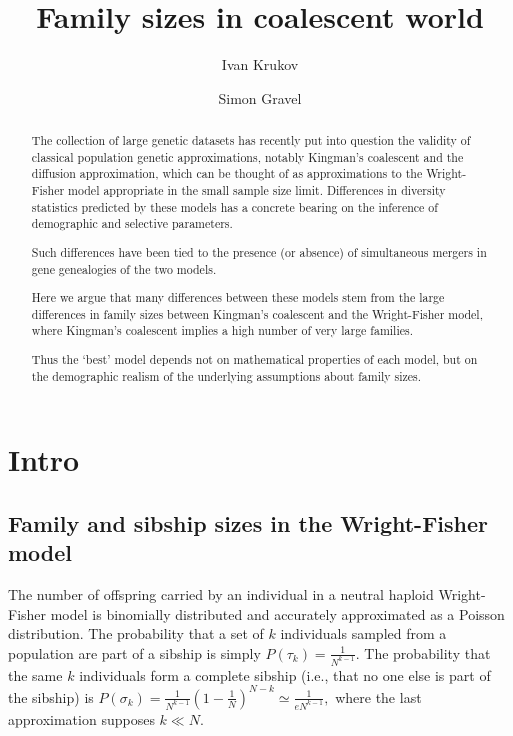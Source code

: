 \documentclass[review,nonatbib]{elsarticle}
\begin{document}
\begin{frontmatter}
  \title{ Family sizes in coalescent world }

  \author{Ivan Krukov}
  \author{Simon Gravel}

  \begin{abstract}
  The collection of large genetic datasets has recently put into question the validity of classical population genetic approximations, 
  notably Kingman's coalescent and the diffusion approximation, which can be thought of as approximations to the Wright-Fisher model appropriate 
  in the small sample size limit.
   Differences in diversity statistics predicted by these models has a concrete bearing on the inference of demographic
    and selective parameters. 

Such differences have been tied to the presence (or absence) of simultaneous mergers 
in gene genealogies of the two models. 

Here we argue that many differences between these models stem from the large differences in family sizes between Kingman's coalescent and the 
Wright-Fisher model, where Kingman's coalescent implies a high number of very large families. 
 
 Thus the `best' model depends not on mathematical properties of each model, but on the demographic realism of the underlying 
 assumptions about family sizes.      
  
  
  \end{abstract}

\end{frontmatter}


\section{Intro}

\subsection{Family and sibship sizes in the Wright-Fisher model}
The number of offspring carried by an individual in a neutral haploid Wright-Fisher model is binomially distributed and accurately approximated as a Poisson distribution.
The probability that a set of $k$ individuals sampled from a population are part of a sibship is simply $P(\tau_k)=\frac{1}{N^{k-1}}.$ The probability that the same 
$k$ individuals form a complete sibship (i.e., that no one else is part of the sibship) is $P(\sigma_k) = \frac{1}{N^{k-1}} \left(1-\frac{1}{N}\right)^{N-k} \simeq \frac{1}{e N^{k-1}},$ where
the last approximation supposes $k\ll N$.
\end{document}
